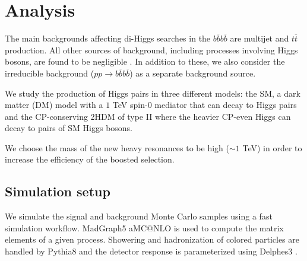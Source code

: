 
\section{Analysis}
\label{sec:imple}


The main backgrounds affecting di-Higgs searches in the $b\overline{b}b\overline{b}$ are multijet and $t\overline{t}$ production. All other sources of background, including processes involving Higgs bosons, are found to be negligible \cite{hh2bbbbATLAS1}. In addition to these, we also consider the irreducible background ($pp\rightarrow b\overline{b}b\overline{b}$) as a separate background source.

We study the production of Higgs pairs in three different models: the SM, a dark matter (DM) model with a $1$ TeV spin-$0$ mediator that can decay to Higgs pairs and the CP-conserving 2HDM of type II where the heavier CP-even Higgs can decay to pairs of SM Higgs bosons.

We choose the mass of the new heavy resonances to be high ($\sim 1$ TeV) in order to increase the efficiency of the boosted selection.

\subsection{Simulation setup}
\label{sec:sim}

We simulate the signal and background Monte Carlo samples using a fast simulation workflow. MadGraph5 aMC@NLO \cite{MG5} is used to compute the matrix elements of a given process. Showering and hadronization of colored particles are handled by Pythia8 \cite{Pythia8} and the detector response is parameterized using Delphes3 \cite{Delphes}. 

